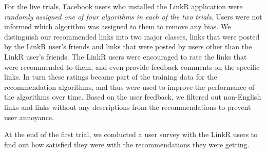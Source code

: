 For the live trials, Facebook users who installed the LinkR
application were \emph{randomly assigned one of four algorithms in
each of the two trials}. Users were not informed which algorithm was
assigned to them to remove any bias. We distinguish our recommended
links into two major classes, links that were posted by the LinkR
user's friends and links that were posted by users other than the
LinkR user's friends. The LinkR users were encouraged to rate the
links that were recommended to them, and even provide feedback
comments on the specific links. In turn these ratings became part of
the training data for the recommendation algorithms, and thus were used
to improve the performance of the algorithms over time. Based on the
user feedback, we filtered out non-English links and links without any
descriptions from the recommendations to prevent user annoyance.

At the end of the first trial, we conducted a user survey with the
LinkR users to find out how satisfied they were with the
recommendations they were getting.
 
